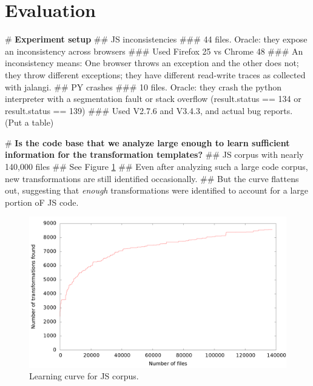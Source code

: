 \documentclass[numbers]{sigplanconf}
\begin{document}
\section{Evaluation}
\label{sec_evaluation}

\begin{easylist}[itemize]
# \textbf{Experiment setup}
## JS inconsistencies
### 44 files. Oracle: they expose an inconsistency across browsers
### Used Firefox 25 vs Chrome 48
### An inconsistency means: One browser throws an exception and the other does not; they throw different exceptions; they have different read-write traces as collected with jalangi.
## PY crashes
### 10 files. Oracle: they crash the python interpreter with a segmentation fault or stack overflow (result.status == 134 or result.status == 139)
### Used V2.7.6 and V3.4.3, and actual bug reports. (Put a table)
\end{easylist}

\begin{easylist}[itemize]
# \textbf{Is the code base that we analyze large enough to learn sufficient information for the transformation templates?}
## JS corpus with nearly 140,000 files
## See Figure \ref{fig_learning-graph-js}
## Even after analyzing such a large code corpus, new transformations are still identified occasionally.
## But the curve flattens out, suggesting that \emph{enough} transformations were identified to account for a large portion oF JS code.
\end{easylist}

\begin{figure}
\begin{center}
\includegraphics[width=\columnwidth]{img/learning-graph-js.png}
\end{center}
\caption{Learning curve for JS corpus.}
\label{fig_learning-graph-js}
\end{figure}
\end{document}
